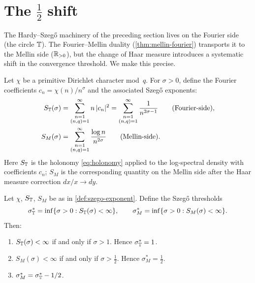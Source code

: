 \section{The $\frac{1}{2}$ shift}\label{sec:half-shift}

The Hardy--Szeg\H{o} machinery of the preceding section lives on the Fourier side (the circle $\mathbb{T}$). The Fourier--Mellin duality (\cref{thm:mellin-fourier}) transports it to the Mellin side ($\mathbb{R}_{>0}$), but the change of Haar measure introduces a systematic shift in the convergence threshold. We make this precise.

\begin{definition}\label{def:szego-exponent}
Let $\chi$ be a primitive Dirichlet character mod~$q$. For $\sigma > 0$, define the Fourier coefficients $c_n = \chi(n)/n^\sigma$ and the associated Szeg\H{o} exponents:
\begin{align}
S_{\mathbb{T}}(\sigma) &= \sum_{\substack{n=1 \\ (n,q)=1}}^{\infty} n\,|c_n|^2 = \sum_{\substack{n=1 \\ (n,q)=1}}^{\infty} \frac{1}{n^{2\sigma - 1}}
\qquad\text{(Fourier-side)}, \label{eq:fourier-szego} \\
S_M(\sigma) &= \sum_{\substack{n=1 \\ (n,q)=1}}^{\infty} \frac{\log n}{n^{2\sigma}}
\qquad\text{(Mellin-side)}. \label{eq:mellin-szego}
\end{align}
Here $S_{\mathbb{T}}$ is the holonomy \eqref{eq:holonomy} applied to the log-spectral density with coefficients $c_n$; $S_M$ is the corresponding quantity on the Mellin side after the Haar measure correction $dx/x \to dy$.
\end{definition}

\begin{theorem}\label{thm:half-shift}
Let $\chi$, $S_{\mathbb{T}}$, $S_M$ be as in \cref{def:szego-exponent}. Define the Szeg\H{o} thresholds
\[
\sigma_{\mathbb{T}}^* = \inf\{\sigma > 0 : S_{\mathbb{T}}(\sigma) < \infty\}, \qquad
\sigma_M^* = \inf\{\sigma > 0 : S_M(\sigma) < \infty\}.
\]
Then:
\begin{enumerate}[label=(\roman*)]
\item $S_{\mathbb{T}}(\sigma) < \infty$ if and only if $\sigma > 1$. Hence $\sigma_{\mathbb{T}}^* = 1$.
\item $S_M(\sigma) < \infty$ if and only if $\sigma > \tfrac{1}{2}$. Hence $\sigma_M^* = \tfrac{1}{2}$.
\item $\sigma_M^* = \sigma_{\mathbb{T}}^* - 1/2$.
\end{enumerate}
\end{theorem}

